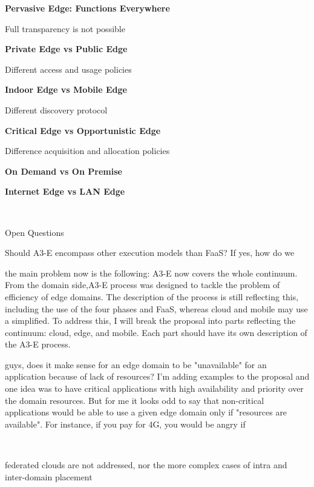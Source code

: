 \textbf{Pervasive Edge: Functions Everywhere}

Full transparency is not possible

\textbf{Private Edge vs Public Edge}

Different access and usage policies

\textbf{Indoor Edge vs Mobile Edge}

Different discovery protocol

\textbf{Critical Edge vs Opportunistic Edge}

Difference acquisition and allocation policies


\textbf{On Demand vs On Premise}

\textbf{Internet Edge vs LAN Edge}


~~~

Open Questions

Should A3-E encompass other execution models than FaaS? If yes, how do we


the main problem now is the following: A3-E now covers the whole continuum. From the domain side,A3-E process was designed to tackle the problem of efficiency of edge domains. The description of the process is still reflecting this, including the use of the four phases and FaaS, whereas cloud and mobile may use a simplified. To address this, I will break the proposal into parts reflecting the continuum: cloud, edge, and mobile. Each part should have its own description of the A3-E process. 


guys, does it make sense for an edge domain to be "unavailable" for an application because of lack of resources? I'm adding examples to the proposal and one idea was to have critical applications with high availability and priority over the domain resources. But for me it looks odd to say that non-critical applications would be able to use a given edge domain only if "resources are available". For instance, if you pay for 4G, you would be angry if 

~~~

federated clouds are not addressed, nor the more complex cases of intra and inter-domain placement
